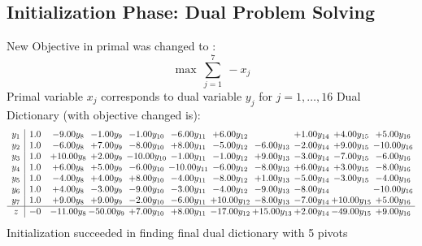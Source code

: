 \documentclass[9pt]{article}
\begin{document}
\subsection{Initialization Phase: Dual Problem Solving}
New Objective in primal was changed to : \[ \max\ \sum_{j=1}^{7}\ - x_j \] 
Primal variable $x_j$ corresponds to dual variable $y_j$ for $j = 1,\ldots,16$
Dual Dictionary (with objective changed is): 
\[\begin{array}{c| c c@{\hskip 2pt} c@{\hskip 2pt} c@{\hskip 2pt} c@{\hskip 2pt} c@{\hskip 2pt} c@{\hskip 2pt} c@{\hskip 2pt} c@{\hskip 2pt} c@{\hskip 2pt} }
 y_{1}   &  1.0 & -9.00 y_{8} & -1.00 y_{9} & -1.00 y_{10} & -6.00 y_{11} & +  6.00 y_{12} &   & +  1.00 y_{14} & +  4.00 y_{15} & +  5.00 y_{16}\\
 y_{2}   &  1.0 & -6.00 y_{8} & +  7.00 y_{9} & -8.00 y_{10} & +  8.00 y_{11} & -5.00 y_{12} & -6.00 y_{13} & -2.00 y_{14} & +  9.00 y_{15} & -10.00 y_{16}\\
 y_{3}   &  1.0 & + 10.00 y_{8} & +  2.00 y_{9} & -10.00 y_{10} & -1.00 y_{11} & -1.00 y_{12} & +  9.00 y_{13} & -3.00 y_{14} & -7.00 y_{15} & -6.00 y_{16}\\
 y_{4}   &  1.0 & +  6.00 y_{8} & +  5.00 y_{9} & -6.00 y_{10} & -10.00 y_{11} & -6.00 y_{12} & -8.00 y_{13} & +  6.00 y_{14} & +  3.00 y_{15} & -8.00 y_{16}\\
 y_{5}   &  1.0 & -4.00 y_{8} & +  4.00 y_{9} & +  8.00 y_{10} & -4.00 y_{11} & -8.00 y_{12} & +  1.00 y_{13} & -5.00 y_{14} & -3.00 y_{15} & -4.00 y_{16}\\
 y_{6}   &  1.0 & +  4.00 y_{8} & -3.00 y_{9} & -9.00 y_{10} & -3.00 y_{11} & -4.00 y_{12} & -9.00 y_{13} & -8.00 y_{14} &   & -10.00 y_{16}\\
 y_{7}   &  1.0 & +  9.00 y_{8} & +  9.00 y_{9} & -2.00 y_{10} & -6.00 y_{11} & + 10.00 y_{12} & -8.00 y_{13} & -7.00 y_{14} & + 10.00 y_{15} & +  5.00 y_{16}\\
\hline
z    &  -0 & -11.00 y_{8} & -50.00 y_{9} & +  7.00 y_{10} & +  8.00 y_{11} & -17.00 y_{12} & + 15.00 y_{13} & +  2.00 y_{14} & -49.00 y_{15} & +  9.00 y_{16}\\
\end{array}\]
Initialization succeeded in finding final dual dictionary with 5 pivots
\end{document}
